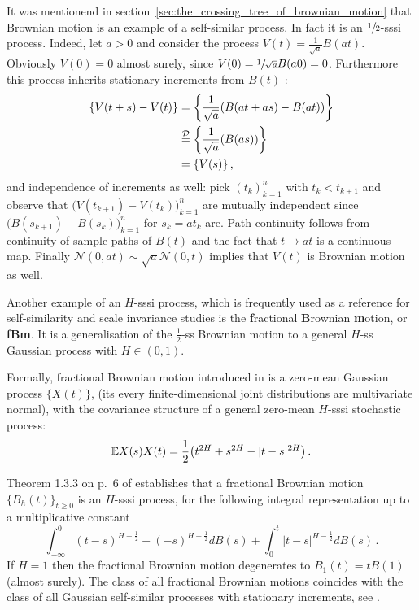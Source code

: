 It was mentionend in section~\ref{sec:the_crossing_tree_of_brownian_motion} that Brownian
motion is an example of a self-similar process. In fact it is an $\sfrac{1}{2}$-sssi process.
Indeed, let $a>0$ and consider the process $V(t) = \frac{1}{\sqrt{a}} B(at)$. Obviously
$V(0) = 0$ almost surely, since $V(0) = \sfrac{1}{\sqrt{a}} B(a 0) = 0$. Furthermore
this process inherits stationary increments from $B(t)$ : \begin{align*}
	\{ V(t+s) - V(t) \} &= \biggl\{ \frac{1}{\sqrt{a}}( B(at+as) - B(at) ) \biggr\}\\
	&\overset{\mathcal{D}}{=} \biggl\{ \frac{1}{\sqrt{a}}( B(as) ) \biggr\} \\
	&= \{ V(s) \} \,,
\end{align*}
and independence of increments as well: pick $(t_k)_{k=1}^n$ with $t_k<t_{k+1}$ and
observe that $\bigl(V(t_{k+1}) - V(t_k)\bigr)_{k=1}^n$ are mutually independent since
$\bigl(B(s_{k+1}) - B(s_k)\bigr)_{k=1}^n$ for $s_k = a t_k$ are. Path continuity follows
from continuity of sample paths of $B(t)$ and the fact that $t\to a t$ is a continuous
map.  Finally $\mathcal{N}(0, at) \sim \sqrt{a} \mathcal{N}(0,t)$ implies that $V(t)$
is Brownian motion as well.

Another example of an $H$-sssi process, which is frequently used as a reference for
self-similarity and scale invariance studies is the \textbf{f}ractional \textbf{B}rownian
\textbf{m}otion, or \textbf{fBm}. It is a generalisation of the $\tfrac{1}{2}$-ss
Brownian motion to a general $H$-ss Gaussian process with $H\in (0, 1)$.

Formally, fractional Brownian motion introduced in \cite{doi:10.1137/1010093} is a
zero-mean Gaussian process $\bigl\{X(t)\bigr\}$, (its every finite-dimensional joint
distributions are multivariate normal), with the covariance structure of a general
zero-mean $H$-sssi stochastic process:
\[ \mathbb{E} X(s) X(t) = \frac{1}{2} \bigl(t^{2H} + s^{2H} - |t-s|^{2H}\bigr) \,. \]

Theorem 1.3.3 on p.~6 of \cite{embrechtsselfsimilar} establishes that a fractional
Brownian motion $\{B_h(t)\}_{t\geq 0}$ is an $H$-sssi process, for the following
integral representation up to a multiplicative constant
\[
\int_{-\infty}^0 (t-s)^{H-\tfrac{1}{2}} - (-s)^{H-\tfrac{1}{2}} dB(s)
+ \int_0^t |t-s|^{H-\tfrac{1}{2}} dB(s) \,.
\]
If $H = 1$ then the fractional Brownian motion degenerates to $B_1(t) = tB(1)$ (almost
surely). The class of all fractional Brownian motions coincides with the class of all
Gaussian self-similar processes with stationary increments, see \cite{embrechtsselfsimilar}. 

